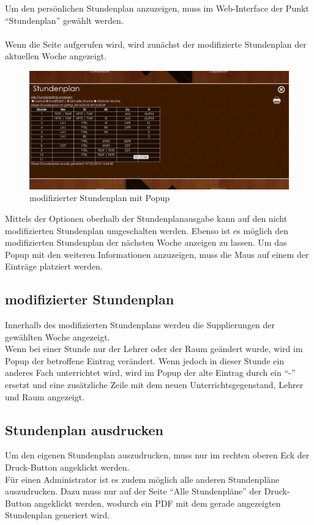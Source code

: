 Um den persönlichen Stundenplan anzuzeigen, muss im Web-Interface der Punkt \enquote{Stundenplan} gewählt werden. \\
\\
Wenn die Seite aufgerufen wird, wird zunächst der modifizierte Stundenplan der aktuellen Woche angezeigt.\\

\begin{figure}[H]
\centering
\includegraphics[keepaspectratio=true, width=14cm]{images/screenshots/timetable_mod.png}
\caption{modifizierter Stundenplan mit Popup}
\label{fig:Web_mod_timetable}
\end{figure}

Mittels der Optionen oberhalb der Stundenplanausgabe kann auf den nicht modifizierten Stundenplan umgeschalten werden. Ebenso ist es möglich den modifizierten Stundenplan der nächsten Woche anzeigen zu lassen.
Um das Popup mit den weiteren Informationen anzuzeigen, muss die Maus auf einem der Einträge platziert werden.
\subsection{modifizierter Stundenplan}
Innerhalb des modifizierten Stundenplans werden die Supplierungen der gewählten Woche angezeigt.\\
Wenn bei einer Stunde nur der Lehrer oder der Raum geändert wurde, wird im Popup der betroffene Eintrag verändert. Wenn jedoch in dieser Stunde ein anderes Fach unterrichtet wird, wird im Popup der alte Eintrag durch ein \enquote{-} ersetzt und eine zusätzliche Zeile mit dem neuen Unterrichtsgegenstand, Lehrer und Raum angezeigt.
\subsection{Stundenplan ausdrucken}
Um den eigenen Stundenplan auszudrucken, muss nur im rechten oberen Eck der Druck-Button angeklickt werden.\\
Für einen Administrator ist es zudem möglich alle anderen Stundenpläne auszudrucken. Dazu muss nur auf der Seite \enquote{Alle Stundenpläne} der Druck-Button angeklickt werden, wodurch ein PDF mit dem gerade angezeigten Stundenplan generiert wird.
